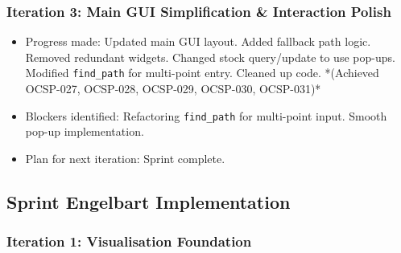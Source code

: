 \subsubsection{Iteration 3: Main GUI Simplification \& Interaction Polish}
\begin{itemize}
	\item Progress made: Updated main GUI layout. Added fallback path logic. Removed redundant widgets. Changed stock query/update to use pop-ups. Modified \verb|find_path| for multi-point entry. Cleaned up code. *(Achieved OCSP-027, OCSP-028, OCSP-029, OCSP-030, OCSP-031)*
	\item Blockers identified: Refactoring \verb|find_path| for multi-point input. Smooth pop-up implementation.
	\item Plan for next iteration: Sprint complete.
\end{itemize}

\clearpage
\subsection{Sprint Engelbart Implementation}

\subsubsection{Iteration 1: Visualisation Foundation}

